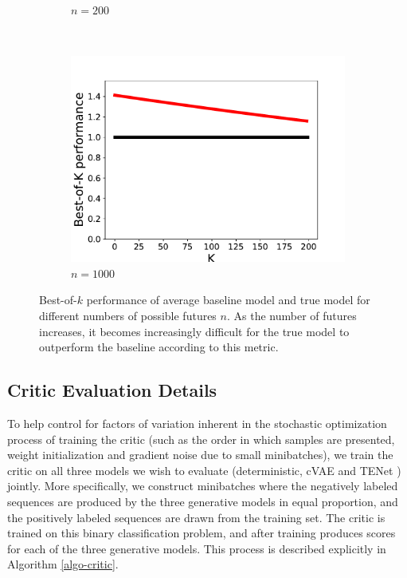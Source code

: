\documentclass{article}
\newcommand{\modelname}{TENet }
\begin{document}
\begin{figure}
\begin{subfigure}[b]{0.3\textwidth}
    \caption{$n=200$}
    \label{fig:tiger}
  \end{subfigure}
  ~ %
  \begin{subfigure}[b]{0.3\textwidth}
    \includegraphics[width=\textwidth]{images/best_of_k_toy_n1000.pdf}
    \caption{$n=1000$}
    \label{fig:mouse}
  \end{subfigure}
  \caption{Best-of-$k$ performance of average baseline model and true model for different numbers of possible futures $n$. As the number of futures increases, it becomes increasingly difficult for the true model to outperform the baseline according to this metric.}\label{expected-loss}
  \end{figure}




\subsection{Critic Evaluation Details}
\label{critic-details}

To help control for factors of variation inherent in the stochastic optimization process of training the critic (such as the order in which samples are presented, weight initialization and gradient noise due to small minibatches), we train the critic on all three models we wish to evaluate (deterministic, cVAE and \modelname) jointly.
More specifically, we construct minibatches where the negatively labeled sequences are produced by the three generative models in equal proportion, and the positively labeled sequences are drawn from the training set.
The critic is trained on this binary classification problem, and after training produces scores for each of the three generative models.
This process is described explicitly in Algorithm \ref{algo-critic}.
\end{document}
